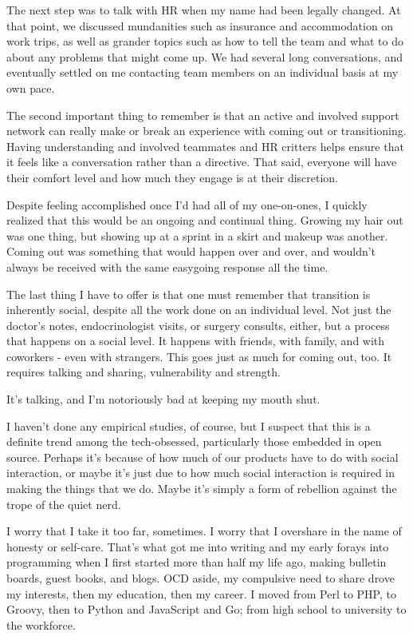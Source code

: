 \documentclass[12pt,letterpaper,oneside]{memoir}
\begin{document}
The next step was to talk with HR when my name had been legally changed.  At that point, we discussed mundanities such as insurance and accommodation on work trips, as well as grander topics such as how to tell the team and what to do about any problems that might come up.  We had several long conversations, and eventually settled on me contacting team members on an individual basis at my own pace.

The second important thing to remember is that an active and involved support network can really make or break an experience with coming out or transitioning.  Having understanding and involved teammates and HR critters helps ensure that it feels like a conversation rather than a directive.  That said, everyone will have their comfort level and how much they engage is at their discretion.

Despite feeling accomplished once I'd had all of my one-on-ones, I quickly realized that this would be an ongoing and continual thing.  Growing my hair out was one thing, but showing up at a sprint in a skirt and makeup was another.  Coming out was something that would happen over and over, and wouldn't always be received with the same easygoing response all the time.

The last thing I have to offer is that one must remember that transition is inherently social, despite all the work done on an individual level.  Not just the doctor's notes, endocrinologist visits, or surgery consults, either, but a process that happens on a social level.  It happens with friends, with family, and with coworkers - even with strangers.  This goes just as much for coming out, too.  It requires talking and sharing, vulnerability and strength.

It's talking, and I'm notoriously bad at keeping my mouth shut.

I haven't done any empirical studies, of course, but I suspect that this is a definite trend among the tech-obsessed, particularly those embedded in open source.  Perhaps it's because of how much of our products have to do with social interaction, or maybe it's just due to how much social interaction is required in making the things that we do.  Maybe it's simply a form of rebellion against the trope of the quiet nerd.

I worry that I take it too far, sometimes.  I worry that I overshare in the name of honesty or self-care.  That's what got me into writing and my early forays into programming when I first started more than half my life ago, making bulletin boards, guest books, and blogs.  OCD aside, my compulsive need to share drove my interests, then my education, then my career.  I moved from Perl to PHP, to Groovy, then to Python and JavaScript and Go; from high school to university to the workforce.
\end{document}
